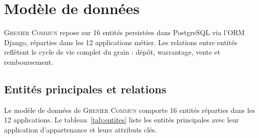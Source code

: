 \documentclass[12pt,a4paper,twoside]{report}
\newcommand{\gc}{\textsc{Grenier Commun}}
\begin{document}
\section{Modèle de données}

\gc{} repose sur 16 entités persistées dans PostgreSQL via l'ORM Django,
réparties dans les 12 applications métier. Les relations entre entités
reflètent le cycle de vie complet du grain : dépôt, warrantage, vente et remboursement.

\subsection{Entités principales et relations}

Le modèle de données de \gc{} comporte 16 entités réparties dans les 12
applications. Le tableau~\ref{tab:entites} liste les entités principales
avec leur application d'appartenance et leurs attributs clés.
\end{document}
